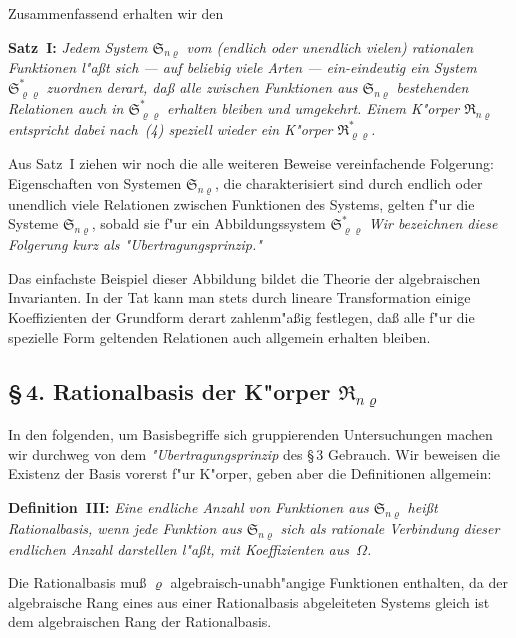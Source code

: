 \documentclass[11pt,a4paper]{article}
\begin{document}
Zusammenfassend erhalten wir den

\medskip
\noindent
\textbf{Satz~I:} \emph{Jedem System $\mathfrak{S}_{n\varrho}$ vom (endlich oder unendlich vielen)
rationalen Funktionen l"{a}\ss{}t sich --- auf beliebig viele Arten --- ein-eindeutig
ein System $\mathfrak{S}_{\varrho\varrho}^{*}$ zuordnen derart, da\ss{} alle zwischen Funktionen aus
$\mathfrak{S}_{n\varrho}$ bestehenden Relationen auch in $\mathfrak{S}_{\varrho\varrho}^{*}$ erhalten bleiben und umgekehrt.
Einem K"{o}rper $\mathfrak{R}_{n\varrho}$ entspricht dabei nach~(4) speziell wieder ein K"{o}rper
$\mathfrak{R}_{\varrho\varrho}^{*}$.}

\smallskip
Aus Satz~I ziehen wir noch die alle weiteren Beweise vereinfachende
Folgerung: Eigenschaften von Systemen $\mathfrak{S}_{n\varrho}$, die charakterisiert sind durch
endlich oder unendlich viele Relationen zwischen Funktionen des Systems,
gelten f"{u}r die Systeme $\mathfrak{S}_{n\varrho}$, sobald sie f"{u}r ein Abbildungssystem $\mathfrak{S}_{\varrho\varrho}^{*}$
\emph{Wir bezeichnen diese Folgerung kurz als \emph{"{U}bertragungsprinzip}."{}}

Das einfachste Beispiel dieser Abbildung bildet die Theorie der
algebraischen Invarianten. In der Tat kann man stets durch lineare
Transformation einige Koeffizienten der Grundform derart zahlenm"{a}\ss{}ig festlegen,
da\ss{} alle f"{u}r die spezielle Form geltenden Relationen auch allgemein
erhalten bleiben.

\subsection*{\S\,4. Rationalbasis der K"{o}rper $\mathfrak{R}_{n\varrho}$}

In den folgenden, um Basisbegriffe sich gruppierenden Untersuchungen
machen wir durchweg von dem \emph{"{U}bertragungsprinzip} des \S\,3 Gebrauch.
Wir beweisen die Existenz der Basis vorerst f"{u}r K"{o}rper, geben aber die
Definitionen allgemein:

\medskip
\noindent
\textbf{Definition~III:} \emph{Eine endliche Anzahl von Funktionen aus
$\mathfrak{S}_{n\varrho}$ hei\ss{}t \emph{Rationalbasis}, wenn jede Funktion aus $\mathfrak{S}_{n\varrho}$ sich als rationale
Verbindung dieser endlichen Anzahl darstellen l"{a}\ss{}t, mit Koeffizienten
aus~$\Omega$.}

Die Rationalbasis mu\ss{} $\varrho$ algebraisch-unabh"{a}ngige Funktionen enthalten,
da der algebraische Rang eines aus einer Rationalbasis abgeleiteten
Systems gleich ist dem algebraischen Rang der Rationalbasis.
\end{document}
